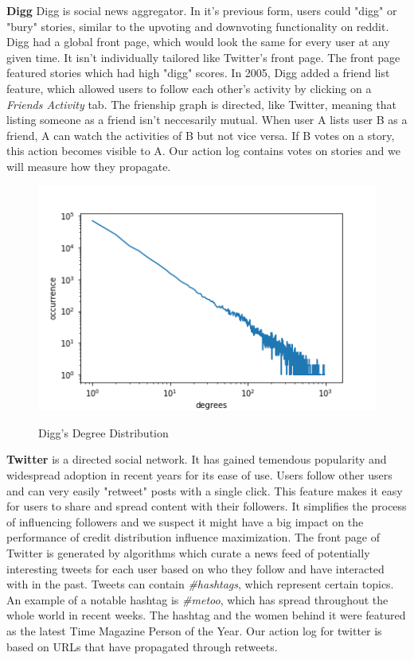 \documentclass{acm_proc_article-sp}
\begin{document}
\textbf{Digg} \cite{data:digg-friends,data:digg-votes,data:digg} Digg is social news aggregator. In it's previous form, users could "digg" or "bury" stories, similar to the upvoting and downvoting functionality on reddit. Digg had a global front page, which would look the same for every user at any given time. It isn't individually tailored like Twitter's front page. The front page featured stories which had high "digg" scores. In 2005, Digg added a friend list feature, which allowed users to follow each other's activity by clicking on a \textit{Friends Activity} tab. The frienship graph is directed, like Twitter, meaning that listing someone as a friend isn't neccesarily mutual. When user A lists user B as a friend, A can watch the activities of B but not vice versa. If B votes on a story, this action becomes visible to A. Our action log contains votes on stories and we will measure how they propagate. \cite{DBLP:journals/corr/abs-1202-3162}

\begin{figure}[h]
	\includegraphics[width=\linewidth]{degree-digg.png}
	\centering
	\label{degree-digg}
	\caption{Digg's Degree Distribution}
\end{figure}

\textbf{Twitter} \cite{data:twitter} is a directed social network. It has gained temendous popularity and widespread adoption in recent years for its ease of use. Users follow other users and can very easily "retweet" posts with a single click. This feature makes it easy for users to share and spread content with their followers. It simplifies the process of influencing followers and we suspect it might have a big impact on the performance of credit distribution influence maximization. The front page of Twitter is generated by algorithms which curate a news feed of potentially interesting tweets for each user based on who they follow and have interacted with in the past. Tweets can contain \textit{\#hashtags}, which represent certain topics. An example of a notable hashtag is \textit{\#metoo}, which has spread throughout the whole world in recent weeks. The hashtag and the women behind it were featured as the latest Time Magazine Person of the Year. Our action log for twitter is based on URLs that have propagated through retweets.
\end{document}
